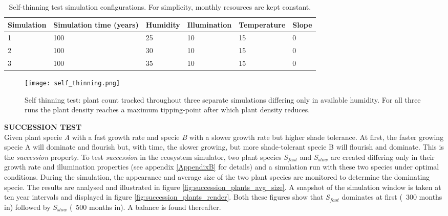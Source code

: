 \begin{table}[]
  \centering
	    \begin{tabular}{|p{2cm}|p{2cm}|p{2cm}|p{2cm}|p{2cm}|p{2cm}|}
		\hline
		\textbf{Simulation} & \textbf{Simulation time (years)} & \textbf{Humidity} & \textbf{Illumination} & \textbf{Temperature} & \textbf{Slope}\\
		\hline       
		1 & 100 & 25 & 10 & 15 & 0\\           
		\hline       
		2 & 100 & 30 & 10 & 15 & 0\\   
		\hline       
		3 & 100 & 35 & 10 & 15 & 0\\              
		\hline       
		\end{tabular}
		\caption{Self-thinning test simulation configurations. For simplicity, monthly resources are kept constant.}
		\label{tab:self_thinning_test_simulations}
\end{table}

\begin{figure}
\center
	\texttt{[image: self\_thinning.png]}
	\caption{ Self thinning test: plant count tracked throughout three separate simulations differing only in available humidity. For all three runs the plant density reaches a maximum tipping-point after which plant density reduces.}
	\label{fig:self_thinning_test_results}
\end{figure}

\textbf{SUCCESSION TEST}\\

Given plant specie \textit{A} with a fast growth rate and specie \textit{B} with a slower growth rate but higher shade tolerance. At first, the faster growing specie A will dominate and flourish but, with time, the slower growing, but more shade-tolerant specie B will flourish and dominate. This is the \textit{succession} property. To test \textit{succession} in the ecosystem simulator, two plant species \textit{S$_{fast}$} and \textit{S$_{slow}$} are created differing only in their growth rate and illumination properties (see appendix \ref{AppendixB} for details) and a simulation run with these two species under optimal conditions. During the simulation, the appearance and average size of the two plant species are monitored to determine the dominating specie. The results are analysed and illustrated in figure \ref{fig:succession_plants_avg_size}. A snapshot of the simulation window is taken at ten year intervals and displayed in figure \ref{fig:succession_plants_render}. Both these figures show that \textit{S$_{fast}$} dominates at first (~300 months in) followed by \textit{S$_{slow}$} (~500 months in). A balance is found thereafter.\\

